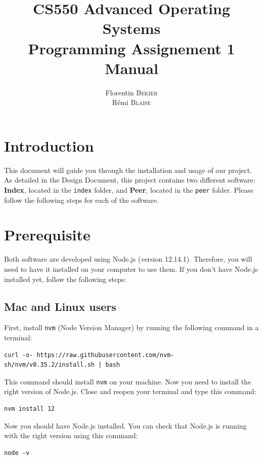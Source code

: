 \documentclass{article}
\title{\textbf{CS550 Advanced Operating Systems\\Programming Assignement 1\\Manual}}
\author{Florentin \textsc{Bekier}\\Rémi \textsc{Blaise}}
\date{}
\begin{document}
\maketitle

\section{Introduction}

This document will guide you through the installation and usage of our project. As detailed in the Design Document, this project contains two different software: \textbf{Index}, located in the \Verb+index+ folder, and \textbf{Peer}, located in the \Verb+peer+ folder. Please follow the following steps for each of the software.

\section{Prerequisite}

Both software are developed using Node.js (version 12.14.1). Therefore, you will need to have it installed on your computer to use them. If you don't have Node.js installed yet, follow the following steps:

\subsection{Mac and Linux users}

First, install \Verb+nvm+ (Node Version Manager) by running the following command in a terminal:

\begin{Verbatim}
curl -o- https://raw.githubusercontent.com/nvm-sh/nvm/v0.35.2/install.sh | bash
\end{Verbatim}

\noindent This command should install \Verb+nvm+ on your machine. Now you need to install the right version of Node.js. Close and reopen your terminal and type this command:

\begin{Verbatim}
nvm install 12
\end{Verbatim}

\noindent Now you should have Node.js installed. You can check that Node.js is running with the right version using this command:

\begin{Verbatim}
node -v
\end{Verbatim}
\end{document}
